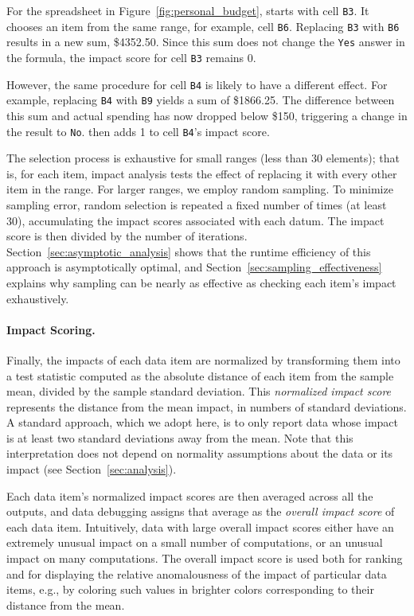 For the spreadsheet in Figure~\ref{fig:personal_budget}, \checkcell{}
starts with cell \texttt{B3}. It chooses an item from the same
range, for example, cell \texttt{B6}. Replacing \texttt{B3}
with \texttt{B6} results in a new sum, \$4352.50. Since this sum does
not change the \texttt{Yes} answer in the formula, the impact score
for cell \texttt{B3} remains 0.

However, the same procedure for cell \texttt{B4} is likely to have a
different effect.  For example, replacing \texttt{B4}
with \texttt{B9} yields a sum of \$1866.25. The difference
between this sum and actual spending has now dropped below \$150,
triggering a change in the result to \texttt{No}. \checkcell{} then
adds 1 to cell \texttt{B4}'s impact score.


The selection process is exhaustive for small ranges (less than 30
elements); that is, for each item, impact analysis tests the effect of
replacing it with every other item in the range. For larger ranges, we
employ random sampling.  To minimize sampling error, random
selection is repeated a fixed number of times (at least 30),
accumulating the impact scores associated with each datum. The impact
score is then divided by the number of
iterations. Section~\ref{sec:asymptotic_analysis} shows that the
runtime efficiency of this approach is asymptotically optimal, and
Section~\ref{sec:sampling_effectiveness} explains why sampling can be nearly as
effective as checking each item's impact exhaustively.

\paragraph{Impact Scoring.}
Finally, the impacts of each data item are normalized by transforming
them into a test statistic computed as the absolute distance of
each item from the sample mean, divided by the sample standard
deviation. This \emph{normalized impact score} represents the distance
from the mean impact, in numbers of standard deviations. A standard
approach, which we adopt here, is to only report data whose impact is
at least two standard deviations away from the mean.  Note
that this interpretation does not depend on normality assumptions
about the data or its impact (see Section~\ref{sec:analysis}).

Each data item's normalized impact scores are then averaged across
all the outputs, and data debugging assigns that average as the
\emph{overall impact score} of each data item. Intuitively, data with
large overall impact scores either have an extremely unusual impact on a
small number of computations, or an unusual impact on many
computations. The overall impact score is used both for ranking and
for displaying the relative anomalousness of the impact of particular
data items, e.g., by coloring such values in brighter colors
corresponding to their distance from the mean.

